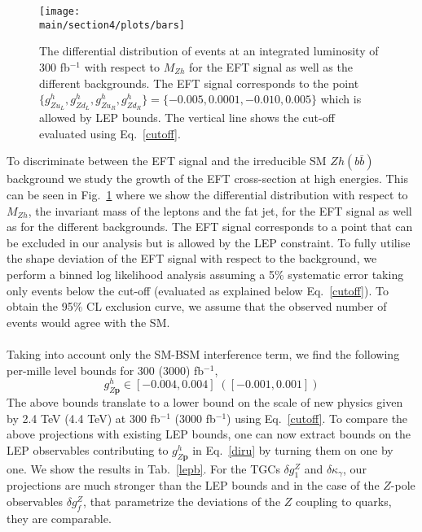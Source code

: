 \begin{figure}[!t]\centering
\texttt{[image: \\main/section4/plots/bars]}
\caption{The differential distribution of events at an integrated luminosity of 300 fb$^{-1}$ with respect to $M_{Zh}$ for the EFT signal as well as the different backgrounds. The EFT signal corresponds to the point $\{{g}^h_{Zu_L} ,{g}^h_{Zd_L} ,{g}^h_{Zu_R} ,{g}^h_{Zd_R} \}=\{-0.005, 0.0001 , -0.010, 0.005 \}$ which is allowed by  LEP bounds. The vertical line shows the cut-off evaluated using Eq.~\ref{cutoff}.}
\label{bars}
\end{figure}

To discriminate between the EFT signal and the irreducible SM $Zh(b\bar b)$ background we study  the 
growth of the EFT cross-section at high energies. This can be seen in Fig.~\ref{bars}  where we show the differential distribution with respect to $M_{Zh}$, the invariant mass of the leptons and the fat jet, for the EFT signal as well as for the different backgrounds. The EFT signal corresponds to a point that can be excluded in our analysis but is allowed by the LEP constraint.  To fully utilise the shape deviation of the EFT signal with respect to the background, 
we perform a binned log likelihood analysis assuming a 5$\%$ systematic error taking only events below the cut-off (evaluated as explained below Eq.~\ref{cutoff}). To obtain the   95$\%$ CL exclusion curve, we assume that 
the observed number of events would agree with the SM. \\ \\

Taking into account only the SM-BSM interference term, we find the following per-mille level bounds for 300 (3000) fb$^{-1}$, 
\begin{equation}
g^h_{Z\textbf{p}} \in  \left[-0.004,0.004\right] \; (\left[-0.001,0.001\right])
\label{obo}
\end{equation}
The above bounds    translate to a lower bound on the scale of new physics given by 2.4 TeV (4.4 TeV) at 300 fb$^{-1}$ (3000 fb$^{-1}$) using Eq.~\ref{cutoff}.  To compare the above projections with existing LEP bounds, one can now extract bounds on the LEP observables contributing to $g^h_{Z\textbf{p}}$ in Eq.~\ref{diru} by turning them  on one by one. We show the results  in Tab.~\ref{lepb}. For the TGCs $\delta g^Z_1$ and $\delta \kappa_\gamma$, our projections are much stronger than the LEP bounds and  in the case of the $Z$-pole observables $\delta g^Z_f$, that parametrize the deviations of the $Z$ coupling to quarks, they are comparable. 

